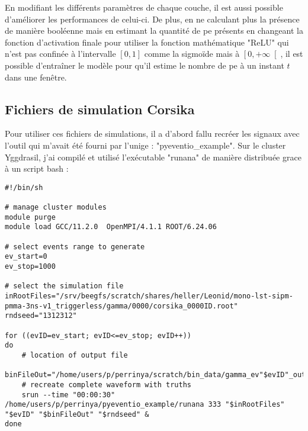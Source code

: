 En modifiant les différents paramètres de chaque couche, il est aussi possible d'améliorer les performances de celui-ci.
De plus, en ne calculant plus la présence de manière booléenne mais en estimant la quantité de \gls{pe} présents 
en changeant la fonction d'activation finale pour utiliser la fonction mathématique "ReLU" qui n'est pas confinée 
à l'intervalle $ \left[ 0, 1\right] $ comme la sigmoïde mais à $ \left[0, +\infty\right[ $, il est possible d'entraîner le modèle
pour qu'il estime le nombre de \gls{pe} à un instant $t$ dans une fenêtre. 




\subsection{Fichiers de simulation Corsika}

Pour utiliser ces fichiers de simulations, il a d'abord fallu recréer les signaux avec l'outil qui m'avait été fourni par l'\gls{unige} : "pyeventio\_example".
Sur le cluster Yggdrasil, j'ai compilé et utilisé l'exécutable "runana" de manière distribuée grace à un script bash :

\begin{lstlisting}[language=iBash,caption={Script de génération des signaux à partir de fichier de simulation, data/slurm-run.sh},captionpos=b]
#!/bin/sh

# manage cluster modules
module purge
module load GCC/11.2.0  OpenMPI/4.1.1 ROOT/6.24.06

# select events range to generate
ev_start=0
ev_stop=1000

# select the simulation file
inRootFiles="/srv/beegfs/scratch/shares/heller/Leonid/mono-lst-sipm-pmma-3ns-v1_triggerless/gamma/0000/corsika_0000ID.root"
rndseed="1312312"

for ((evID=ev_start; evID<=ev_stop; evID++))
do
	# location of output file
	binFileOut="/home/users/p/perrinya/scratch/bin_data/gamma_ev"$evID"_out.bin"
	# recreate complete waveform with truths
	srun --time "00:00:30" /home/users/p/perrinya/pyeventio_example/runana 333 "$inRootFiles" "$evID" "$binFileOut" "$rndseed" &
done
\end{lstlisting}

